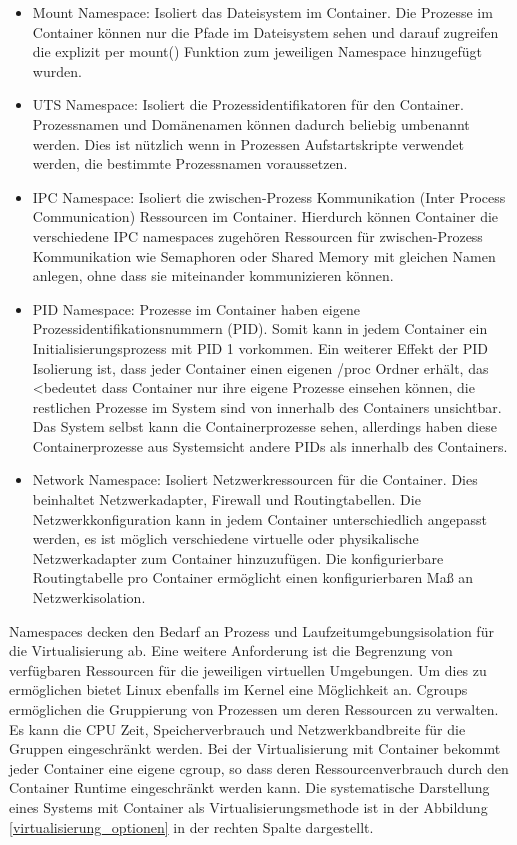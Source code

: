 \begin{itemize}
	\item Mount Namespace: Isoliert das Dateisystem im Container. Die Prozesse im Container können nur die Pfade im Dateisystem sehen und darauf zugreifen die explizit per mount() Funktion zum jeweiligen Namespace hinzugefügt wurden.
	\item UTS Namespace: Isoliert die Prozessidentifikatoren für den Container. Prozessnamen und Domänenamen können dadurch beliebig umbenannt werden. Dies ist nützlich wenn in Prozessen Aufstartskripte verwendet werden, die bestimmte Prozessnamen voraussetzen.
	\item IPC Namespace: Isoliert die zwischen-Prozess Kommunikation (Inter Process Communication) Ressourcen im Container. Hierdurch können Container die verschiedene IPC namespaces zugehören Ressourcen für zwischen-Prozess Kommunikation wie Semaphoren oder Shared Memory mit gleichen Namen anlegen, ohne dass sie miteinander kommunizieren können.
	\item PID Namespace: Prozesse im Container haben eigene Prozessidentifikationsnummern (PID). Somit kann in jedem Container ein Initialisierungsprozess mit PID 1 vorkommen. Ein weiterer Effekt der PID Isolierung ist, dass jeder Container einen eigenen /proc Ordner erhält, das <bedeutet dass Container nur ihre eigene Prozesse einsehen können, die restlichen Prozesse im System sind von innerhalb des Containers unsichtbar. Das System selbst kann die Containerprozesse sehen, allerdings haben diese Containerprozesse aus Systemsicht andere PIDs als innerhalb des Containers.
	\item Network Namespace: Isoliert Netzwerkressourcen für die Container. Dies beinhaltet Netzwerkadapter, Firewall und Routingtabellen. Die Netzwerkkonfiguration kann in jedem Container unterschiedlich angepasst werden, es ist möglich verschiedene virtuelle oder physikalische Netzwerkadapter zum Container hinzuzufügen. Die konfigurierbare Routingtabelle pro Container ermöglicht einen konfigurierbaren Maß an Netzwerkisolation.
\end{itemize} 

Namespaces decken den Bedarf an Prozess und Laufzeitumgebungsisolation für die Virtualisierung ab. Eine weitere Anforderung ist die Begrenzung von verfügbaren Ressourcen für die jeweiligen virtuellen Umgebungen. Um dies zu ermöglichen bietet Linux ebenfalls im Kernel eine Möglichkeit an. Cgroups ermöglichen die Gruppierung von Prozessen um deren Ressourcen zu verwalten. Es kann die CPU Zeit, Speicherverbrauch und Netzwerkbandbreite für die Gruppen eingeschränkt werden. Bei der Virtualisierung mit Container bekommt jeder Container eine eigene cgroup, so dass deren Ressourcenverbrauch durch den Container Runtime eingeschränkt werden kann. \cite{Red_2024} 
Die systematische Darstellung eines Systems mit Container als Virtualisierungsmethode ist in der Abbildung \ref{virtualisierung_optionen} in der rechten Spalte dargestellt. 

